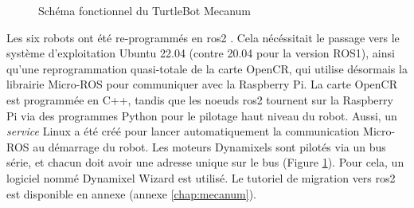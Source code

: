 \begin{figure}[h]
    \caption{Schéma fonctionnel du TurtleBot Mecanum}
    \label{fig:tb-mecanum-schema}
\end{figure}


Les six robots ont été re-programmés en \gls{ros2} . Cela nécéssitait le passage vers le système d'exploitation Ubuntu 22.04 (contre 20.04 pour la version ROS1), ainsi qu'une reprogrammation quasi-totale de la carte OpenCR, qui utilise désormais la librairie Micro-ROS pour communiquer avec la Raspberry Pi. La carte OpenCR est programmée en C++, tandis que les noeuds \gls{ros2} tournent sur la Raspberry Pi via des programmes Python pour le pilotage haut niveau du robot. Aussi, un \textit{service} Linux a été créé pour lancer automatiquement la communication Micro-ROS au démarrage du robot. Les moteurs Dynamixels sont pilotés via un bus série, et chacun doit avoir une adresse unique sur le bus (Figure \ref{fig:tb-mecanum-schema}). Pour cela, un logiciel nommé Dynamixel Wizard est utilisé.
Le tutoriel de migration vers \gls{ros2} est disponible en annexe (annexe \ref{chap:mecanum}). 


